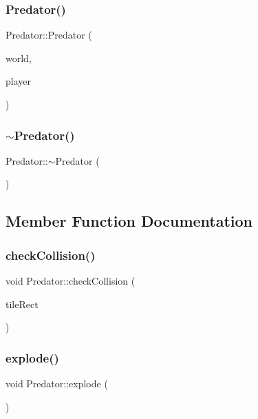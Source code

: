 \subsubsection{\texorpdfstring{Predator()}{Predator()}}
{\footnotesize\ttfamily Predator\+::\+Predator (\begin{DoxyParamCaption}\item[{\mbox{\hyperlink{class_world}{World}} $\ast$}]{world,  }\item[{\mbox{\hyperlink{class_player}{Player}} \&}]{player }\end{DoxyParamCaption})}

\mbox{\label{class_predator_a9ef1a4a3a5988d1d1e5844a235b36b8b}} 
\subsubsection{\texorpdfstring{$\sim$Predator()}{~Predator()}}
{\footnotesize\ttfamily Predator\+::$\sim$\+Predator (\begin{DoxyParamCaption}{ }\end{DoxyParamCaption})}



\subsection{Member Function Documentation}
\mbox{\label{class_predator_a4d2d48c955e92d23f95909e4e1f6a16f}} 
\subsubsection{\texorpdfstring{checkCollision()}{checkCollision()}}
{\footnotesize\ttfamily void Predator\+::check\+Collision (\begin{DoxyParamCaption}\item[{sf\+::\+Float\+Rect}]{tile\+Rect }\end{DoxyParamCaption})}

\mbox{\label{class_predator_a830de5346a893f15b76de907f798138a}} 
\subsubsection{\texorpdfstring{explode()}{explode()}}
{\footnotesize\ttfamily void Predator\+::explode (\begin{DoxyParamCaption}{ }\end{DoxyParamCaption})}

